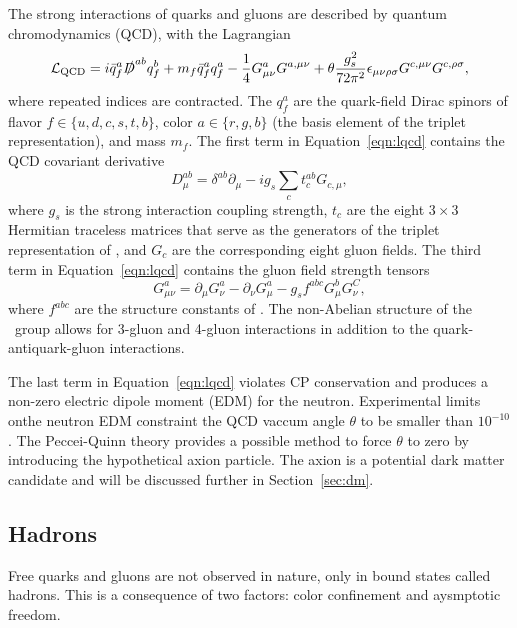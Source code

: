 The strong interactions of quarks and gluons are described by quantum chromodynamics (QCD), with the Lagrangian
\begin{equation}
  \label{eqn:lqcd}
  \mathcal{L}_{\text{QCD}} = i \bar q_f^a \slashed D^{ab} q_f^b + m_f \bar q_f^a q_f^a - \frac{1}{4} G_{\mu\nu}^a G^{a,\mu\nu} + \theta \frac{g_s^2}{72\pi^2} \epsilon_{\mu\nu\rho\sigma} G^{c,\mu\nu} G^{c, \rho\sigma},
\end{equation}
where repeated indices are contracted.
The $q_f^a$ are the quark-field Dirac spinors of flavor $f \in \{u,d,c,s,t,b\}$, color $a \in \{r,g,b\}$ (the basis element of the triplet representation), and mass $m_f$.
The first term in Equation~\ref{eqn:lqcd} contains the QCD covariant derivative
\begin{equation}
  D_{\mu}^{ab} = \delta^{ab} \partial_\mu - i g_s \sum_{c} t_c^{ab} G_{c,\mu},
\end{equation}
where $g_s$ is the strong interaction coupling strength, $t_c$ are the eight $3\times3$ Hermitian traceless matrices that serve as the generators of the triplet representation of \suthree, and $G_c$ are the corresponding eight gluon fields.
The third term in Equation~\ref{eqn:lqcd} contains the gluon field strength tensors
\begin{equation}
  G_{\mu\nu}^a = \partial_\mu G_\nu^a - \partial_\nu G_\mu^a - g_s f^{abc} G_\mu^b G_\nu^C,
\end{equation}
where $f^{abc}$ are the structure constants of \suthree.
The non-Abelian structure of the \suthree\ group allows for 3-gluon and 4-gluon interactions in addition to the quark-antiquark-gluon interactions.

The last term in Equation~\ref{eqn:lqcd} violates CP conservation and produces a non-zero electric dipole moment (EDM) for the neutron.
Experimental limits onthe neutron EDM constraint the QCD vaccum angle $\theta$ to be smaller than $10^{-10}$.
The Peccei-Quinn theory provides a possible method to force $\theta$ to zero by introducing the hypothetical axion particle. The axion is a potential dark matter candidate and will be discussed further in Section~\ref{sec:dm}.

\subsection{Hadrons}
\label{sec:hadrons}

Free quarks and gluons are not observed in nature, only in bound states called hadrons.
This is a consequence of two factors: color confinement and aysmptotic freedom.

